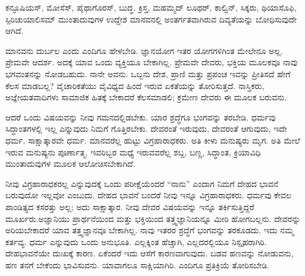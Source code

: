 ಕನ್ಫೂಷಿಯಸ್​, ಮೋಸೆಸ್​, ಪೈಥಾಗೊರಸ್​, ಬುದ್ಧ. ಕ್ರಿಸ್ತ, ಮಹಮ್ಮದ್​ ಲೂಥರ್​, ಕಾಲ್ವಿನ್​, ಸಿಕ್ಕರು, ಥಿಯಾಸೊಫಿ, ಸ್ಪಿರಿಚುಯಾಲಿಸಮ್​ ಮುಂತಾದುವುಗಳ ಉದ್ದೇಶ ಮಾನವನಲ್ಲಿ ಅಂತರ್ಗತವಾಗಿರುವ ದಿವ್ಯತೆಯನ್ನು ಬೋಧಿಸುವುದೇ ಆಗಿದೆ.

ಮಾನವನು ದುರ್ಬಲ ಎಂದು ಎಂದಿಗೂ ಹೇಳಬೇಡಿ. ಜ್ಞಾನಯೋಗ ಇತರ ಯೋಗಗಳಿಗಿಂತ ಮೇಲೇನೂ ಅಲ್ಲ. ಪ್ರೇಮವೇ ಆದರ್ಶ. ಅದಕ್ಕೆ ಯಾವ ಒಂದು ವ್ಯಕ್ತಿಯೂ ಬೇಕಾಗಿಲ್ಲ. ಪ್ರೇಮವೇ ದೇವರು, ಭಕ್ತಿಯ ಮೂಲಕವೂ ನಾವು ಭಗವಂತನನ್ನು ನೋಡಬಹುದು. ನಾನೇ ಅವನು. ಒಬ್ಬನು ದೇಶ, ಪ್ರಾಣಿ ಮತ್ತು ಪ್ರಪಂಚ ಇವನ್ನು ಪ್ರೀತಿಸದೆ ಹೇಗೆ ಕೆಲಸ ಮಾಡಬಲ್ಲ? ವೈಚಾರಿಕತೆಯು ವೈವಿಧ್ಯದ ಹಿಂದೆ ಇರುವ ಏಕತೆಯನ್ನು ತೋರಿಸುತ್ತದೆ. ನಾಸ್ತಿಕರು, ಅಜ್ಞೇಯತವಾದಿಗಳು ಸಾಮಾಜಿಕ ಹಿತಕ್ಕೆ ಬೇಕಾದರೆ ಕೆಲಸಮಾಡಲಿ; ಕ್ರಮೇಣ ದೇವರು ಈ ಮೂಲಕ ಬರುವನು.

ಆದರೆ ಒಂದು ವಿಷಯವನ್ನು ನೀವು ಗಮನದಲ್ಲಿಡಬೇಕು. ಯಾರ ಶ್ರದ್ಧೆಗೂ ಭಂಗವನ್ನು ತರಬೇಡಿ. ಧರ್ಮವು ಸಿದ್ಧಾಂತಗಳಲ್ಲಿ ಇಲ್ಲ ಎನ್ನುವುದು ನಿಮಗೆ ಗೊತ್ತಿರಬೇಕು. ದೇವರಂತೆ ಇರುವುದು, ದೇವರಂತೆ ಆಗುವುದು, ಇದೇ ಧರ್ಮ. ಸಾಕ್ಷಾತ್ಕಾರವೇ ಧರ್ಮ. ಮಾನವರೆಲ್ಲ ಹುಟ್ಟು ವಿಗ್ರಹಾರಾಧಕರು. ಅತಿ ಕೀಳು ಮನುಷ್ಯರು ಮೃಗ. ಅತಿ ಮೇಲೆ ಇರುವ ಮನುಷ್ಯನು ಪೂರ್ಣಾತ್ಮ. ಇವರಿಬ್ಬರ ಮಧ್ಯೆ ಇರುವವರೆಲ್ಲ ಶಬ್ದ, ಬಣ್ಣ, ಸಿದ್ಧಾಂತ, ಕ್ರಿಯಾವಿಧಿ ಮುಂತಾದುವುಗಳ ಮೂಲಕ ಆಲೋಚಿಸಬೇಕಾಗಿದೆ.

ನೀವು ವಿಗ್ರಹಾರಾಧಕರಲ್ಲ ಎನ್ನುವುದಕ್ಕೆ ಒಂದು ಪರೀಕ್ಷೆಯೆಂದರೆ “ನಾನು” ಎಂದಾಗ ನಿಮಗೆ ದೇಹದ ಭಾವನೆ ಬರುವುದೋ ಇಲ್ಲವೋ ಎಂಬುದು. ದೇಹದ ಭಾವನೆ ಬಂದರೆ ನೀವು ಇನ್ನೂ ವಿಗ್ರಹಾರಾಧಕರು. ಧರ್ಮವು ಕೇವಲ ಪಾಂಡಿತ್ಯದ ಕಸರತ್ತು ಅಲ್ಲ; ಅದು ಸಾಕ್ಷಾತ್ಕಾರ. ನೀವು ದೇವರ ವಿಷಯವನ್ನು ಇನ್ನೂ ತರ್ಕಿಸುತ್ತಿದ್ದರೆ ಮೂರ್ಖರು.\break ಅಜ್ಞಾನಿಯು ಪ್ರಾರ್ಥನೆಯಿಂದ ಮತ್ತು ಭಕ್ತಿಯಿಂದ ತತ್ತ್ವಜ್ಞಾನಿಯನ್ನೂ ಮೀರಿ ಹೋಗಬಲ್ಲನು. ದೇವರನ್ನು ಅರಿಯಬೇಕಾದರೆ ಯಾವ ತತ್ತ್ವಜ್ಞಾನವೂ ಬೇಕಾಗಿಲ್ಲ. ನಾವು ಇತರರ ಶ್ರದ್ಧೆಗೆ ಭಂಗವನ್ನು ತರಕೂಡದು. ಇದು ನಮ್ಮ ಕರ್ತವ್ಯ. ಧರ್ಮ ಎನ್ನುವುದು ಒಂದು ಅನುಭೂತಿ. ಎಲ್ಲಕ್ಕಿಂತ ಹೆಚ್ಚಾಗಿ, ಎಲ್ಲದರಲ್ಲಿಯೂ ನಿಸ್ಪೃಹರಾಗಿರಿ. ದೇಹಭಾವನೆಯೇ ದುಃಖಕ್ಕೆ ಕಾರಣ. ಏಕೆಂದರೆ ಇದು ಆಸೆಗೆ ಕಾರಣವಾಗುವುದು. ಬಡವ ಹಣವನ್ನು ನೋಡುವನು, ಹಣ ತನಗೆ ಬೇಕೆಂದು ಭಾವಿಸುವನು. ಯಾವಾಗಲೂ ಸಾಕ್ಷಿಯಾಗಿರಿ. ಎಂದಿಗೂ ಪ್ರತಿಕ್ರಿಯೆ ತೋರಿಸಬೇಡಿ.

